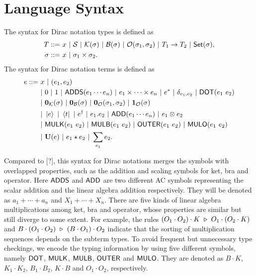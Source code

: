 \documentclass{article}
\begin{document}
\section{Language Syntax}
\begin{definition}[syntax]
    The syntax for Dirac notation types is defined as 
    \begin{align*}
        T ::=\ & x\ |\ \SType\ |\ \KType(\sigma)\ |\ \BType(\sigma)\ |\ \OType(\sigma_1, \sigma_2)\ |\ T_1 \to T_2\ |\ \SET(\sigma), \\
        \sigma ::=\ & x\ |\ \sigma_1 \times \sigma_2.
    \end{align*}
    The syntax for Dirac notation terms is defined as
    \begin{align*}
        e ::=\ & x\ |\ (e_1, e_2) \\
        & |\ 0\ |\ 1\ |\ \ADDS(e_1 \cdots e_n) \ |\ e_1 \times \cdots \times e_n\ |\ e^* \ |\ \delta_{e_1, e_2}\ |\ \DOT(e_1\ e_2) \\
        & |\ \ZEROK(\sigma)\ |\ \ZEROB(\sigma)\ |\ \ZEROO(\sigma_1, \sigma_2)\ |\ \ONEO(\sigma) \\
        & |\ \ket{e}\ |\ \bra{t}\ |\ e^\dagger\ |\ e_1.e_2\ |\ \ADD(e_1 \cdots e_n)\ |\ e_1 \otimes e_2 \\
        & |\ \MULK(e_1\ e_2)\ |\ \MULB(e_1\ e_2)\ |\ \OUTER(e_1\ e_2)\ |\ \MULO(e_1\ e_2) \\
        & |\ \mathbf{U}(e)\ |\ e_1 \star e_2\ |\ \sum_{e_1} e_2.
    \end{align*}
\end{definition}

Compared to [?], this syntax for Dirac notations merges the symbols with overlapped properties, such as the addition and scaling symbols for ket, bra and operator.
Here $\mathsf{ADDS}$ and $\mathsf{ADD}$ are two different AC symbols representing the scalar addition and the linear algebra addition respectively. They will be denoted as $a_1 + \cdots + a_n$ and $X_1 + \cdots + X_n$.
There are five kinds of linear algebra multiplications among ket, bra and operator, whose properties are similar but still diverge to some extent. For example, the rules $(O_1 \cdot O_2) \cdot K\ \triangleright\ O_1 \cdot (O_2 \cdot K)$ and $B \cdot (O_1 \cdot O_2) \ \triangleright\ (B \cdot O_1) \cdot O_2$ indicate that the sorting of multiplication sequences depends on the subterm types. To avoid frequent but unnecessary type checkings, we encode the typing information by using five different symbols, namely $\mathsf{DOT}$, $\mathsf{MULK}$, $\mathsf{MULB}$, $\mathsf{OUTER}$ and $\mathsf{MULO}$. They are denoted as $B\cdot K$, $K_1 \cdot K_2$, $B_1 \cdot B_2$, $K \cdot B$ and $O_1 \cdot O_2$, respectively.
\end{document}
